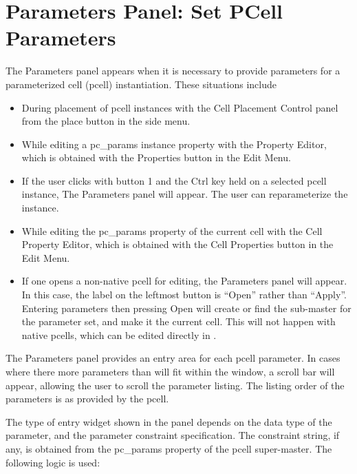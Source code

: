 \section{Parameters Panel:  Set PCell Parameters}
\label{pcparams}

The {\cb Parameters} panel appears when it is necessary to provide
parameters for a parameterized cell (pcell) instantiation.  These
situations include

\begin{itemize}
\item{During placement of pcell instances with the {\cb Cell Placement
Control} panel from the {\cb place} button in the side menu.}

\item{While editing a {\et pc\_params} instance property with the {\cb
Property Editor}, which is obtained with the {\cb Properties} button
in the {\cb Edit Menu}.}

\item{If the user clicks with button 1 and the {\kb Ctrl} key held on
a selected pcell instance, The {\cb Parameters} panel will appear. 
The user can reparameterize the instance.}

\item{While editing the {\et pc\_params} property of the current cell
with the {\cb Cell Property Editor}, which is obtained with the {\cb
Cell Properties} button in the {\cb Edit Menu}.}

\item{If one opens a non-native pcell for editing, the {\cb
Parameters} panel will appear.  In this case, the label on the
leftmost button is ``{\cb Open}'' rather than ``{\cb Apply}''. 
Entering parameters then pressing {\cb Open} will create or find the
sub-master for the parameter set, and make it the current cell.  This
will not happen with native pcells, which can be edited directly in
{\Xic}.}
\end{itemize}

The {\cb Parameters} panel provides an entry area for each pcell
parameter.  In cases where there more parameters than will fit within
the window, a scroll bar will appear, allowing the user to scroll the
parameter listing.  The listing order of the parameters is as provided
by the pcell.

The type of entry widget shown in the panel depends on the data type
of the parameter, and the parameter constraint specification.  The
constraint string, if any, is obtained from the {\et pc\_params}
property of the pcell super-master.  The following logic is used:

